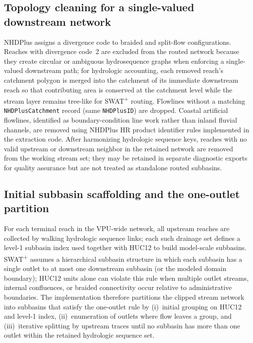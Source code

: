 \subsection{Topology cleaning for a single-valued downstream network}
NHDPlus assigns a divergence code to braided and split-flow configurations.
Reaches with divergence code~2 are excluded from the routed network because they create circular or ambiguous hydrosequence graphs when enforcing a single-valued downstream path; for hydrologic accounting, each removed reach's catchment polygon is merged into the catchment of its immediate downstream reach so that contributing area is conserved at the catchment level while the stream layer remains tree-like for SWAT\textsuperscript{+} routing.
Flowlines without a matching \texttt{NHDPlusCatchment} record (same \texttt{NHDPlusID}) are dropped.
Coastal artificial flowlines, identified as boundary-condition line work rather than inland fluvial channels, are removed using NHDPlus HR product identifier rules implemented in the extraction code.
After harmonizing hydrologic sequence keys, reaches with no valid upstream or downstream neighbor in the retained network are removed from the working stream set; they may be retained in separate diagnostic exports for quality assurance but are not treated as standalone routed subbasins.

\subsection{Initial subbasin scaffolding and the one-outlet partition}
For each terminal reach in the VPU-wide network, all upstream reaches are collected by walking hydrologic sequence links; each such drainage set defines a level-1 subbasin index used together with HUC12 to build model-scale subbasins.
SWAT\textsuperscript{+} assumes a hierarchical subbasin structure in which each subbasin has a single outlet to at most one downstream subbasin (or the modeled domain boundary); HUC12 units alone can violate this rule when multiple outlet streams, internal confluences, or braided connectivity occur relative to administrative boundaries.
The implementation therefore partitions the clipped stream network into subbasins that satisfy the one-outlet rule by (i)~initial grouping on HUC12 and level-1 index, (ii)~enumeration of outlets where flow leaves a group, and (iii)~iterative splitting by upstream traces until no subbasin has more than one outlet within the retained hydrologic sequence set.

